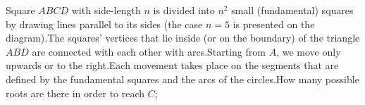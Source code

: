 Square $ABCD$ with side-length $n$ is divided into $n^2$ small (fundamental) squares by drawing lines parallel to its sides (the case $n=5$ is presented on the diagram).The squares' vertices that lie inside (or on the boundary) of the triangle $ABD$ are connected with each other with arcs.Starting from $A$, we move only upwards or to the right.Each movement takes place on the segments that are defined by the fundamental squares and the arcs of the circles.How many possible roots are there in order to reach $C$;